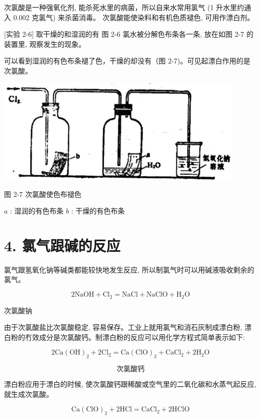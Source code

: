 \documentclass[10pt]{article}
\begin{document}
次氯酸是一种强氧化剂, 能杀死水里的病菌，所以自来水常用氯气 (1 升水里约通入 0.002 克氯气) 来杀菌消毒。 次氯酸能使染料和有机色质褪色, 可用作漂白剂。

[实验 2-6] 取干燥的和湿润的有 图 2-6 氯水被分解色布条各一条, 放在如图 2-7 的装置里, 观察发生的现象。

可以看到湿润的有色布条褪了色，干燥的却没有（图 2-7)。可见起漂白作用的是次氯酸。

\begin{center}
\includegraphics[max width=0.9\textwidth]{images/01912d0f-097c-7e75-8f32-4f326cd86c9f_36_305019.jpg}
\end{center}

图 2-7 次氯酸使色布褪色

\(a\) : 湿润的有色布条 \(b\) : 干燥的有色布条

\section*{4. 氯气跟碱的反应}

氯气跟氢氧化钠等碱类都能较快地发生反应, 所以制氯气时可以用碱液吸收剩余的氯气。

\[
2\mathrm{{NaOH}} + {\mathrm{{Cl}}}_{2} = \mathrm{{NaCl}} + \mathrm{{NaClO}} + {\mathrm{H}}_{2}\mathrm{O}
\]

次氯酸钠

由于次氯酸盐比次氯酸稳定, 容易保存。工业上就用氯气和消石灰制成漂白粉, 漂白粉的冇效成分是次氯酸钙。制漂白粉的反应可以用化学方程式简单表示如下:

\[
2\mathrm{{Ca}}{\left( \mathrm{{OH}}\right) }_{2} + 2{\mathrm{{Cl}}}_{2} = \mathrm{{Ca}}{\left( \mathrm{{ClO}}\right) }_{2} + {\mathrm{{CaCl}}}_{2} + 2{\mathrm{H}}_{2}\mathrm{O}
\]

\[
\text{次氯酸钙}
\]

漂白粉应用于漂白的时候, 使次氯酸钙跟稀酸或空气里的二氧化碳和水蒸气起反应, 就生成次氯酸。

\[
\mathrm{{Ca}}{\left( \mathrm{{ClO}}\right) }_{2} + 2\mathrm{{HCl}} = {\mathrm{{CaCl}}}_{2} + 2\mathrm{{HClO}}
\]
\end{document}
